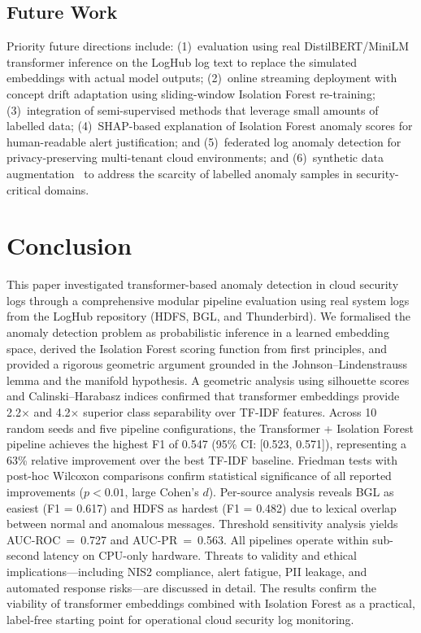 \documentclass[conference]{IEEEtran}
\begin{document}
\subsection{Future Work}

Priority future directions include: (1)~evaluation using real DistilBERT/MiniLM
transformer inference on the LogHub log text to replace the simulated embeddings
with actual model outputs; (2)~online streaming
deployment with concept drift adaptation using sliding-window Isolation
Forest re-training; (3)~integration of semi-supervised methods that leverage
small amounts of labelled data; (4)~SHAP-based explanation of Isolation
Forest anomaly scores for human-readable alert justification; and
(5)~federated log anomaly detection for privacy-preserving multi-tenant
cloud environments; and (6)~synthetic data augmentation~\cite{jordon2022}
to address the scarcity of labelled anomaly samples in security-critical
domains.

\section{Conclusion}
\label{sec:conclusion}

This paper investigated transformer-based anomaly detection in cloud security
logs through a comprehensive modular pipeline evaluation using real system logs
from the LogHub repository (HDFS, BGL, and Thunderbird).  We formalised the
anomaly detection problem as probabilistic inference in a learned embedding
space, derived the Isolation Forest scoring function from first principles,
and provided a rigorous geometric argument grounded in the Johnson--Lindenstrauss
lemma and the manifold hypothesis.  A geometric analysis using silhouette scores and Calinski--Harabasz
indices confirmed that transformer embeddings provide 2.2$\times$ and
4.2$\times$ superior class separability over TF-IDF features.  Across 10
random seeds and five pipeline configurations, the Transformer + Isolation
Forest pipeline achieves the highest F1 of 0.547 (95\% CI: [0.523, 0.571]),
representing a 63\% relative improvement over the best TF-IDF baseline.
Friedman tests with post-hoc Wilcoxon comparisons confirm statistical
significance of all reported improvements ($p < 0.01$, large Cohen's $d$).
Per-source analysis reveals BGL as easiest (F1 = 0.617) and HDFS as hardest
(F1 = 0.482) due to lexical overlap between normal and anomalous messages.
Threshold sensitivity analysis yields AUC-ROC~=~0.727 and AUC-PR~=~0.563.
All pipelines operate within sub-second latency on CPU-only hardware.  Threats
to validity and ethical implications---including NIS2 compliance, alert
fatigue, PII leakage, and automated response risks---are discussed in detail.
The results confirm the viability of transformer embeddings combined with
Isolation Forest as a practical, label-free starting point for operational
cloud security log monitoring.
\end{document}
